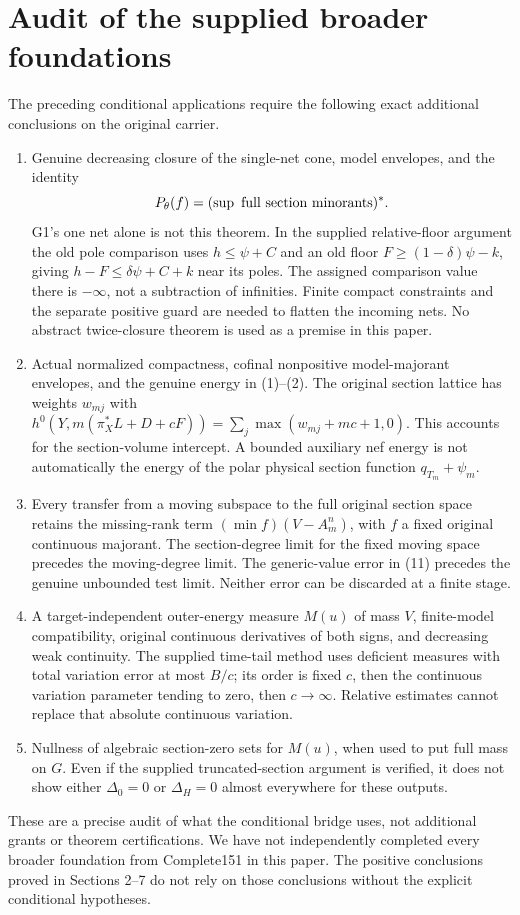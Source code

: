 \documentclass[10pt]{article}
\begin{document}
\section{Audit of the supplied broader foundations}
The preceding conditional applications require the following exact
additional conclusions on the original carrier.
\begin{enumerate}
\item Genuine decreasing closure of the single-net cone, model envelopes,
and the identity
\[
 P_\theta(f)=(\sup\hbox{ full section minorants})^*.
\]
G1's one net alone is not this theorem. In the supplied relative-floor
argument the old pole comparison uses $h\leq\psi+C$ and an old floor
$F\geq(1-\delta)\psi-k$, giving
$h-F\leq\delta\psi+C+k$ near its poles. The assigned comparison value
there is $-\infty$, not a subtraction of infinities.
Finite compact constraints and the separate positive guard are needed
to flatten the incoming nets. No abstract twice-closure theorem is used
as a premise in this paper.
\item Actual normalized compactness, cofinal nonpositive model-majorant
envelopes, and the genuine energy in (1)--(2).
The original section lattice has weights $w_{mj}$ with
$h^0(Y,m(\pi_X^*L+D+cF))=\sum_j\max(w_{mj}+mc+1,0)$.
This accounts for the section-volume intercept. A bounded auxiliary
nef energy is not automatically the energy of the polar physical
section function $q_{T_m}+\psi_m$.
\item Every transfer from a moving subspace to the full original section
space retains the missing-rank term
$(\min f)(V-A_m^n)$, with $f$ a fixed original continuous majorant.
The section-degree limit for the fixed moving space precedes the
moving-degree limit. The generic-value error in (11) precedes the
genuine unbounded test limit. Neither error can be discarded at a
finite stage.
\item A target-independent outer-energy measure $M(u)$ of mass $V$,
finite-model compatibility, original continuous derivatives of both
signs, and decreasing weak continuity. The supplied time-tail method
uses deficient measures with total variation error at most $B/c$;
its order is fixed $c$, then the continuous variation parameter tending
to zero, then $c\to\infty$. Relative estimates cannot replace that
absolute continuous variation.
\item Nullness of algebraic section-zero sets for $M(u)$, when used to
put full mass on $G$. Even if the supplied truncated-section argument
is verified, it does not show either $\Delta_0=0$ or
$\Delta_H=0$ almost everywhere for these outputs.
\end{enumerate}
These are a precise audit of what the conditional bridge uses, not
additional grants or theorem certifications. We have not independently
completed every broader foundation from Complete151 in this paper.
The positive conclusions proved in Sections 2--7 do not rely on those
conclusions without the explicit conditional hypotheses.
\end{document}
